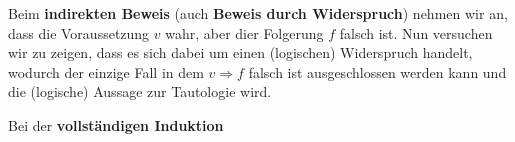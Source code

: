 \documentclass[../../main.tex]{subfiles}
\begin{document}
	\begin{definition}
		Beim \textbf{indirekten Beweis} (auch \textbf{Beweis durch Widerspruch}) nehmen wir an, dass die Voraussetzung $v$ wahr, aber dier Folgerung $f$ falsch ist. Nun versuchen wir zu zeigen, dass es sich dabei um einen (logischen) Widerspruch handelt, wodurch der einzige Fall in dem $v \Rightarrow f$ falsch ist ausgeschlossen werden kann und die (logische) Aussage zur Tautologie wird.
	\end{definition}

	\begin{definition}
		Bei der \textbf{vollständigen Induktion}
	\end{definition}
\end{document}
